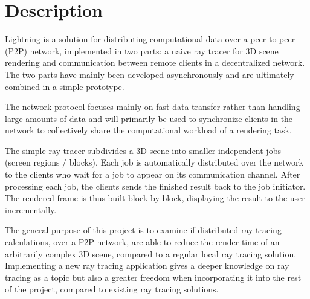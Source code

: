 \chapter{Description}


Lightning is a solution for distributing computational data over a peer-to-peer (P2P) network, implemented in two parts: a naive ray tracer for 3D scene rendering and communication between remote clients in a decentralized network. The two parts have mainly been developed asynchronously and are ultimately combined in a simple prototype. 

The network protocol focuses mainly on fast data transfer rather than handling
large amounts of data and will primarily be used to synchronize clients in the
network to collectively share the computational workload of a rendering task.

The simple ray tracer subdivides a 3D scene into smaller independent jobs
(screen regions / blocks). Each job is automatically distributed over the
network to the clients who wait for a job to appear on its communication
channel. After processing each job, the clients sends the finished result back
to the job initiator. The rendered frame is thus built block by block,
displaying the result to the user incrementally. 

The general purpose of this project is to examine if distributed ray tracing calculations, over a P2P network, are able to reduce the render time of an arbitrarily complex 3D scene, compared to a regular local ray tracing solution. Implementing a new ray tracing application gives a deeper knowledge on ray tracing as a topic but also a greater freedom when incorporating it into the rest of the project, compared to existing ray tracing solutions.

